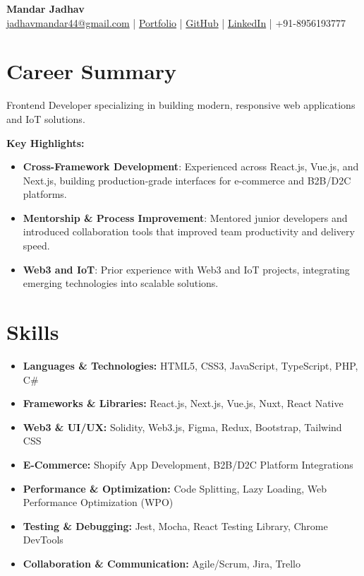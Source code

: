 \documentclass[letterpaper,11pt]{article}
\newcommand{\resumeItem}[2]{
  \item\small{
    \textbf{#1}{: #2 \vspace{-2pt}}
  }
}
\newcommand{\resumeSubHeadingListStart}{\begin{itemize}[leftmargin=*]}
\newcommand{\resumeSubHeadingListEnd}{\end{itemize}}
\newcommand{\resumeItemListStart}{\begin{itemize}[topsep=0pt, itemsep=-2pt, leftmargin=*]}
\newcommand{\resumeItemListEnd}{\end{itemize}\vspace{2pt}}
\begin{document}
\begin{center}
  \textbf{\Huge Mandar Jadhav} \\
  \vspace{2pt}
  \href{mailto:jadhavmandar44@gmail.com}{jadhavmandar44@gmail.com} \quad | \quad
  \href{https://mandar.is-a.dev/}{Portfolio} \quad | \quad
  \href{https://github.com/m-jadhav19/}{GitHub} \quad | \quad
  \href{https://www.linkedin.com/in/mjadhav19/}{LinkedIn} \quad | \quad
  +91-8956193777
\end{center}

\section{Career Summary}
  \vspace{-2pt}
  \small
Frontend Developer specializing in building modern, responsive web applications and IoT solutions.

  \textbf{Key Highlights:}
  \resumeItemListStart
    \resumeItem{Cross-Framework Development}{Experienced across React.js, Vue.js, and Next.js, building production-grade interfaces for e-commerce and B2B/D2C platforms.}
    \resumeItem{Mentorship \& Process Improvement}{Mentored junior developers and introduced collaboration tools that improved team productivity and delivery speed.}
    \resumeItem{Web3 and IoT}{Prior experience with Web3 and IoT projects, integrating emerging technologies into scalable solutions.}
  \resumeItemListEnd

\section{Skills}
 \resumeSubHeadingListStart
   \item{\textbf{Languages \& Technologies:} HTML5, CSS3, JavaScript, TypeScript, PHP, C{\lserif\#}}
   \item{\textbf{Frameworks \& Libraries:} React.js, Next.js, Vue.js, Nuxt, React Native}
   \item{\textbf{Web3 \& UI/UX:} Solidity, Web3.js, Figma, Redux, Bootstrap, Tailwind CSS}
   \item{\textbf{E-Commerce:} Shopify App Development, B2B/D2C Platform Integrations}
   \item{\textbf{Performance \& Optimization:} Code Splitting, Lazy Loading, Web Performance Optimization (WPO)}
   \item{\textbf{Testing \& Debugging:} Jest, Mocha, React Testing Library, Chrome DevTools}
   \item{\textbf{Collaboration \& Communication:} Agile/Scrum, Jira, Trello}
 \resumeSubHeadingListEnd
\end{document}
